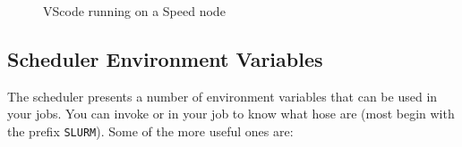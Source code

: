 \begin{figure}[htbp]
	\centering
	\caption{VScode running on a Speed node}
	\label{fig:vscode}
\end{figure}

\subsection{Scheduler Environment Variables}
\label{sect:env-vars}

The scheduler presents a number of environment variables that can be used in 
your jobs. You can invoke  or  in your
job to know what hose are (most begin with the prefix \texttt{SLURM}).
%
Some of the more useful ones are:


